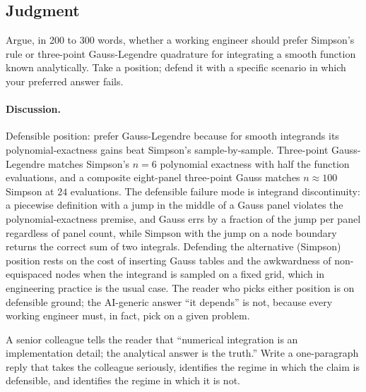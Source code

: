 \subsection*{Judgment}

\begin{exercise}
Argue, in 200 to 300 words, whether a working engineer should
prefer Simpson's rule or three-point Gauss-Legendre quadrature for
integrating a smooth function known analytically. Take a position;
defend it with a specific scenario in which your preferred answer
fails.
\end{exercise}

\paragraph{Discussion.}
Defensible position: prefer Gauss-Legendre because for smooth
integrands its polynomial-exactness gains beat Simpson's
sample-by-sample. Three-point Gauss-Legendre matches Simpson's
$n = 6$ polynomial exactness with half the function evaluations,
and a composite eight-panel three-point Gauss matches
$n \approx 100$ Simpson at $24$ evaluations. The defensible
failure mode is integrand discontinuity: a piecewise definition
with a jump in the middle of a Gauss panel violates the
polynomial-exactness premise, and Gauss errs by a fraction of the
jump per panel regardless of panel count, while Simpson with the
jump on a node boundary returns the correct sum of two integrals.
Defending the alternative (Simpson) position rests on the cost of
inserting Gauss tables and the awkwardness of non-equispaced
nodes when the integrand is sampled on a fixed grid, which in
engineering practice is the usual case. The reader who picks
either position is on defensible ground; the AI-generic answer
``it depends'' is not, because every working engineer must, in
fact, pick on a given problem.

\begin{exercise}
A senior colleague tells the reader that ``numerical integration
is an implementation detail; the analytical answer is the truth.''
Write a one-paragraph reply that takes the colleague seriously,
identifies the regime in which the claim is defensible, and
identifies the regime in which it is not.
\end{exercise}

